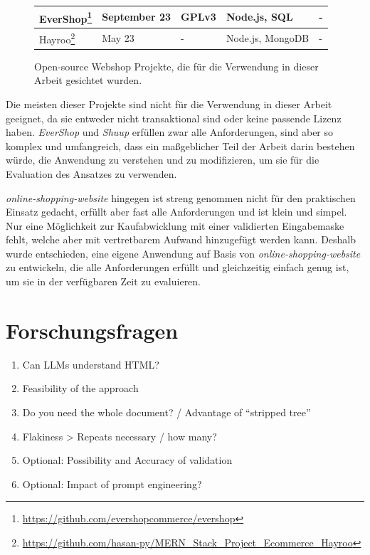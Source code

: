 \begin{figure}[h]
\begin{minipage}[c]{\textwidth}
{\begin{tabular}{ | l | l | l | l | l |}
                EverShop\footnote{\url{https://github.com/evershopcommerce/evershop}} & September 23 & GPLv3 & Node.js, SQL & - \\ \hline
                Hayroo\footnote{\url{https://github.com/hasan-py/MERN_Stack_Project_Ecommerce_Hayroo}} & May 23 & - & Node.js, MongoDB & - \\ \hline
            \end{tabular}
        }
    \end{minipage}
    \caption{Open-source Webshop Projekte, die für die Verwendung in dieser Arbeit gesichtet wurden.}
    \label{tab:webshop_projects}
\end{figure}

Die meisten dieser Projekte sind nicht für die Verwendung in dieser Arbeit geeignet, da sie entweder nicht transaktional sind oder keine passende Lizenz haben.
\textit{EverShop} und \textit{Shuup} erfüllen zwar alle Anforderungen, sind aber so komplex und umfangreich, dass ein maßgeblicher Teil der Arbeit darin bestehen würde, die Anwendung zu verstehen und zu modifizieren, um sie für die Evaluation des Ansatzes zu verwenden.

\textit{online-shopping-website} hingegen ist streng genommen nicht für den praktischen Einsatz gedacht, erfüllt aber fast alle Anforderungen und ist klein und simpel.
Nur eine Möglichkeit zur Kaufabwicklung mit einer validierten Eingabemaske fehlt, welche aber mit vertretbarem Aufwand hinzugefügt werden kann.
Deshalb wurde entschieden, eine eigene Anwendung auf Basis von \textit{online-shopping-website} zu entwickeln, die alle Anforderungen erfüllt und gleichzeitig einfach genug ist, um sie in der verfügbaren Zeit zu evaluieren.

\section{Forschungsfragen}


\begin{enumerate}
    \item Can LLMs understand HTML?
    \item Feasibility of the approach
    \item Do you need the whole document? / Advantage of “stripped tree”
    \item Flakiness > Repeats necessary / how many?
    \item Optional: Possibility and Accuracy of validation
    \item Optional: Impact of prompt engineering?
\end{enumerate}


